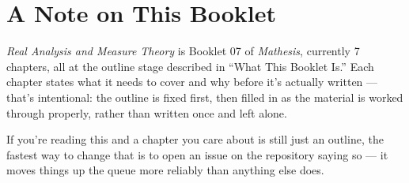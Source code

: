 \chapter*{A Note on This Booklet}

\textit{Real Analysis and Measure Theory} is Booklet 07 of \textit{Mathesis}, currently 7 chapters, all at the outline stage described in ``What This Booklet Is.'' Each chapter states what it needs to cover and why before it's actually written --- that's intentional: the outline is fixed first, then filled in as the material is worked through properly, rather than written once and left alone.

If you're reading this and a chapter you care about is still just an outline, the fastest way to change that is to open an issue on the repository saying so --- it moves things up the queue more reliably than anything else does.
